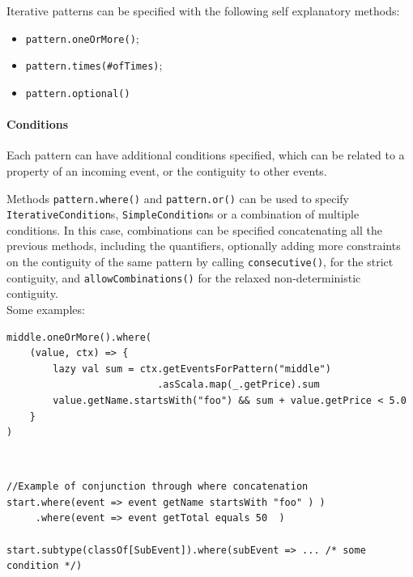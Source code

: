 Iterative patterns can be specified with the following self explanatory methods:

\begin{itemize}
    \item \texttt{pattern.oneOrMore()};
    \item \texttt{pattern.times(\#ofTimes)};
    \item \texttt{pattern.optional()}
\end{itemize}

\paragraph{Conditions}

Each pattern can have additional conditions specified, which can be related to a property of an incoming event, or the contiguity to other events.

Methods \texttt{pattern.where()} and \texttt{pattern.or()} can be used to specify \texttt{IterativeCondition}s, \texttt{SimpleCondition}s or a combination of multiple conditions. In this case, combinations can be specified concatenating all the previous methods, including the quantifiers, optionally adding more constraints on the contiguity of the same pattern by calling \texttt{consecutive()}, for the strict contiguity, and \texttt{allowCombinations()} for the relaxed non-deterministic contiguity.
\\
Some examples:

\begin{code}
\label{code:iterative-cond}
\begin{verbatim}
middle.oneOrMore().where(
    (value, ctx) => {
        lazy val sum = ctx.getEventsForPattern("middle")
                          .asScala.map(_.getPrice).sum
        value.getName.startsWith("foo") && sum + value.getPrice < 5.0
    }
)
\end{verbatim}
\end{code}~\\

\begin{code}
    \label{code:simple-cond}
    \begin{verbatim}
//Example of conjunction through where concatenation
start.where(event => event getName startsWith "foo" ) )
     .where(event => event getTotal equals 50  )

start.subtype(classOf[SubEvent]).where(subEvent => ... /* some condition */)
    \end{verbatim}
\end{code}~\\


